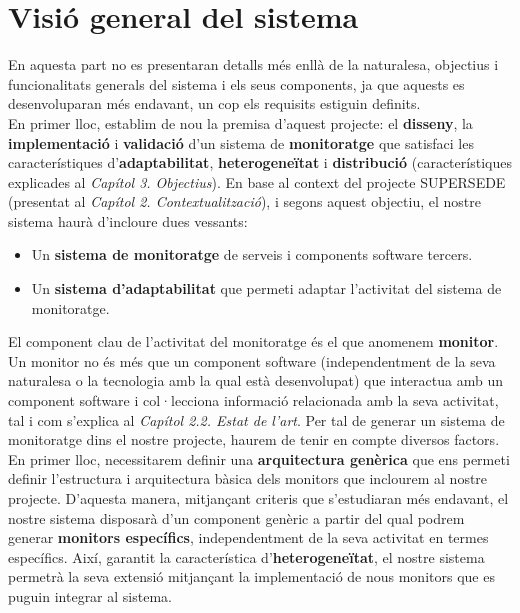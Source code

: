 
\chapter{Visió general del sistema} %

\label{AnalisiRequisits} %

En aquesta part no es presentaran detalls més enllà de la naturalesa, objectius i funcionalitats generals del sistema i els seus components, ja que aquests es desenvoluparan més endavant, un cop els requisits estiguin definits.\\

En primer lloc, establim de nou la premisa d'aquest projecte: el \textbf{disseny}, la \textbf{implementació} i \textbf{validació} d'un sistema de \textbf{monitoratge} que satisfaci les característiques d'\textbf{adaptabilitat}, \textbf{heterogeneïtat} i \textbf{distribució} (característiques explicades al \textit{Capítol 3. Objectius}). En base al context del projecte SUPERSEDE (presentat al \textit{Capítol 2. Contextualització}), i segons aquest objectiu, el nostre sistema haurà d'incloure dues vessants:

\begin{itemize}
\item Un \textbf{sistema de monitoratge} de serveis i components software tercers.
\item Un \textbf{sistema d'adaptabilitat} que permeti adaptar l'activitat del sistema de monitoratge.
\end{itemize}

El component clau de l'activitat del monitoratge és el que anomenem \textbf{monitor}. Un monitor no és més que un component software (independentment de la seva naturalesa o la tecnologia amb la qual està desenvolupat) que interactua amb un component software i col·lecciona informació relacionada amb la seva activitat, tal i com s'explica al \textit{Capítol 2.2. Estat de l'art}. Per tal de generar un sistema de monitoratge dins el nostre projecte, haurem de tenir en compte diversos factors.\\

En primer lloc, necessitarem definir una \textbf{arquitectura genèrica} que ens permeti definir l'estructura i arquitectura bàsica dels monitors que inclourem al nostre projecte. D'aquesta manera, mitjançant criteris que s'estudiaran més endavant, el nostre sistema disposarà d'un component genèric a partir del qual podrem generar \textbf{monitors específics}, independentment de la seva activitat en termes específics. Així, garantit la característica d'\textbf{heterogeneïtat}, el nostre sistema permetrà la seva extensió mitjançant la implementació de nous monitors que es puguin integrar al sistema.\\

